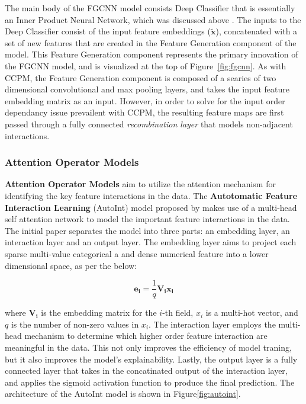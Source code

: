 \documentclass{mldsmsc}
\begin{document}
The main body of the FGCNN model consists Deep Classifier that is essentially an Inner Product
Neural Network, which was discussed above \citep{RefWorks:qu2018product-based}. The inputs
to the Deep Classifier consist of the input feature embeddings ($\tilde{\mathbf{x}}$), concatenated
with a set of new features that are created in the Feature Generation component of the model. This
Feature Generation component represents the primary innovation of the FGCNN model, and is visualized
at the top of Figure~\ref{fig:fgcnn}. As with CCPM, the Feature Generation component is composed of
a searies of two dimensional convolutional and max pooling layers, and takes the input feature
embedding matrix as an input. However, in order to solve for the input order dependancy issue
prevailent with CCPM, the resulting feature maps are first passed through a fully connected \emph{recombination layer}
that models non-adjacent interactions.

\subsubsection{Attention Operator Models}

\textbf{Attention Operator Models} aim to utilize the attention mechanism for identifying
the key feature interactions in the data. The \textbf{Autotomatic Feature Interaction Learning} (AutoInt) 
model proposed by \cite{RefWorks:song2019autoint} makes use of a multi-head self attention
network to model the important feature interactions in the data. The initial 
paper separates the model into three parts: an embedding layer, an interaction layer 
and an output layer. The embedding layer aims to project each sparse multi-value
categorical a and dense numerical feature into a lower dimensional space, as per the below:

$$
\mathbf{e_i} = \frac{1}{q} \mathbf{V_i x_i}
$$

where $\mathbf{V_i}$ is the embedding matrix for the $i$-th field, $x_i$ is a multi-hot vector, and $q$ 
is the number of non-zero values in $x_i$. The interaction layer employs the multi-head
mechanism to determine which higher order feature interaction are meaningful in the data. This not only
improves the efficiency of model traning, but it also improves the model's explainability. Lastly,
the output layer is a fully connected layer that takes in the concatinated output 
of the interaction layer, and applies the sigmoid activation function to produce the final prediction.
The architecture of the AutoInt model is shown in Figure\ref{fig:autoint}.
\end{document}
